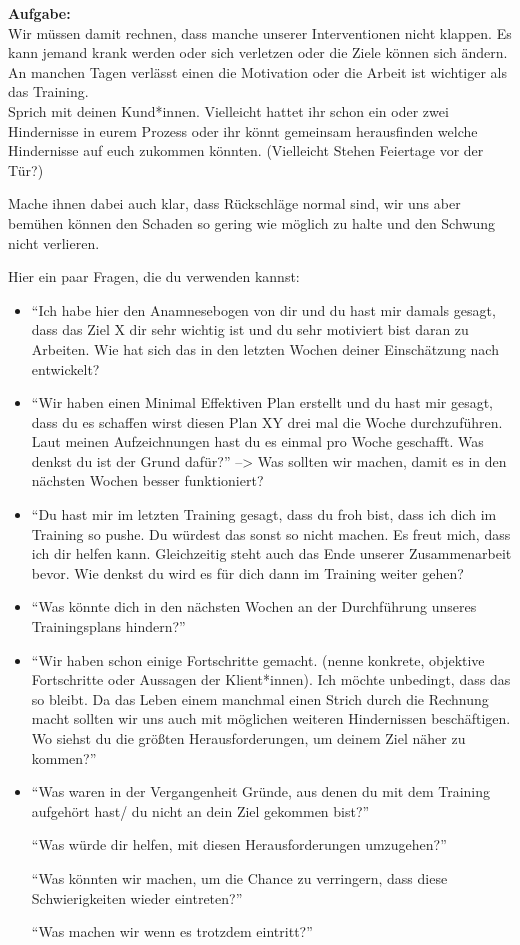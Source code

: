 \documentclass[
  letterpaper,
  DIV=11,
  numbers=noendperiod]{scrreprt}
\begin{document}
\textbf{Aufgabe:}\\
Wir müssen damit rechnen, dass manche unserer Interventionen nicht
klappen. Es kann jemand krank werden oder sich verletzen oder die Ziele
können sich ändern. An manchen Tagen verlässt einen die Motivation oder
die Arbeit ist wichtiger als das Training.\\
Sprich mit deinen Kund*innen. Vielleicht hattet ihr schon ein oder zwei
Hindernisse in eurem Prozess oder ihr könnt gemeinsam herausfinden
welche Hindernisse auf euch zukommen könnten. (Vielleicht Stehen
Feiertage vor der Tür?)

Mache ihnen dabei auch klar, dass Rückschläge normal sind, wir uns aber
bemühen können den Schaden so gering wie möglich zu halte und den
Schwung nicht verlieren.

Hier ein paar Fragen, die du verwenden kannst:

\begin{itemize}
\item
  ``Ich habe hier den Anamnesebogen von dir und du hast mir damals
  gesagt, dass das Ziel X dir sehr wichtig ist und du sehr motiviert
  bist daran zu Arbeiten. Wie hat sich das in den letzten Wochen deiner
  Einschätzung nach entwickelt?
\item
  ``Wir haben einen Minimal Effektiven Plan erstellt und du hast mir
  gesagt, dass du es schaffen wirst diesen Plan XY drei mal die Woche
  durchzuführen. Laut meinen Aufzeichnungen hast du es einmal pro Woche
  geschafft. Was denkst du ist der Grund dafür?'' --\textgreater{} Was
  sollten wir machen, damit es in den nächsten Wochen besser
  funktioniert?
\item
  ``Du hast mir im letzten Training gesagt, dass du froh bist, dass ich
  dich im Training so pushe. Du würdest das sonst so nicht machen. Es
  freut mich, dass ich dir helfen kann. Gleichzeitig steht auch das Ende
  unserer Zusammenarbeit bevor. Wie denkst du wird es für dich dann im
  Training weiter gehen?
\item
  ``Was könnte dich in den nächsten Wochen an der Durchführung unseres
  Trainingsplans hindern?''
\item
  ``Wir haben schon einige Fortschritte gemacht. (nenne konkrete,
  objektive Fortschritte oder Aussagen der Klient*innen). Ich möchte
  unbedingt, dass das so bleibt. Da das Leben einem manchmal einen
  Strich durch die Rechnung macht sollten wir uns auch mit möglichen
  weiteren Hindernissen beschäftigen. Wo siehst du die größten
  Herausforderungen, um deinem Ziel näher zu kommen?''
\item
  ``Was waren in der Vergangenheit Gründe, aus denen du mit dem Training
  aufgehört hast/ du nicht an dein Ziel gekommen bist?''

  ``Was würde dir helfen, mit diesen Herausforderungen umzugehen?''

  ``Was könnten wir machen, um die Chance zu verringern, dass diese
  Schwierigkeiten wieder eintreten?''

  ``Was machen wir wenn es trotzdem eintritt?''
\end{itemize}
\end{document}
